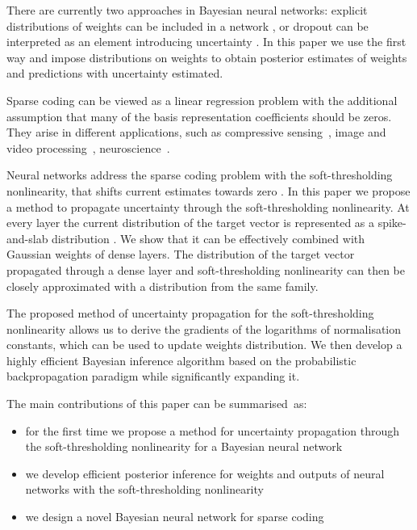 \documentclass[letterpaper]{article}
\begin{document}
There are currently two approaches in Bayesian neural networks: explicit distributions of weights can be included in a network \citep{hernandez2015probabilistic, ranganath2015deep}, or dropout can be interpreted as an element introducing uncertainty \citep{gal2016dropout}. In this paper we use the first way and impose distributions on weights to obtain posterior estimates of weights and predictions with uncertainty estimated.

Sparse coding can be viewed as a linear regression problem with the additional assumption that many of the basis representation coefficients should be zeros. They arise in different applications, such as compressive sensing~\citep{candes2008introduction}, image and video processing~\citep{mairal2014sparse}, neuroscience~\citep{baillet1997bayesian, jas2017learning}. 

Neural networks address the sparse coding problem with the soft-thresholding nonlinearity, that shifts current estimates towards zero \citep{gregor2010learning}. In this paper we propose a method to propagate uncertainty through the soft-thresholding nonlinearity. At every layer the current distribution of the target vector is represented as a spike-and-slab distribution \citep{mitchell1988bayesian}. We show that it can be effectively combined with Gaussian weights of dense layers. The distribution of the target vector propagated through a dense layer and soft-thresholding nonlinearity can then be closely approximated with a distribution from the same family.

The proposed method of uncertainty propagation for the soft-thresholding nonlinearity allows us to derive the gradients of the logarithms of normalisation constants, which can be used to update weights distribution. We then develop a highly efficient Bayesian inference algorithm based on the probabilistic backpropagation paradigm while significantly expanding it.

The main contributions of this paper can be summarised~as: 
\begin{itemize}
\item for the first time we propose a method for uncertainty propagation through the soft-thresholding nonlinearity for a Bayesian neural network
\item we develop efficient posterior inference for weights and outputs of neural networks with the soft-thresholding nonlinearity
\item we design a novel Bayesian neural network for sparse coding
\end{itemize}
\end{document}
